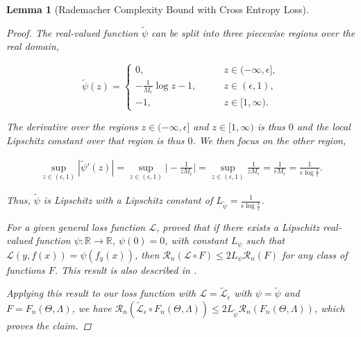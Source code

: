 \documentclass{article}
\newtheorem{lemma}[theorem]{Lemma}
\begin{document}
\begin{lemma}[Rademacher Complexity Bound with Cross Entropy Loss]
\begin{proof}
				The real-valued function $\tilde{\psi}$ can be split into three piecewise regions over the real domain,
				
				\begin{equation}
					\tilde{\psi}(z) = \begin{cases}
						0, \qquad &z \in (-\infty, \epsilon], \\
						- \frac{1}{M_{\epsilon}}\log{z} - 1, \qquad & z \in (\epsilon, 1), \\
						-1, & z \in [1, \infty).
					\end{cases}
				\end{equation}
				
				The derivative over the regions $z \in (-\infty, \epsilon]$ and $z \in [1, \infty)$ is thus $0$ and the local Lipschitz constant over that region is thus $0$. We then focus on the other region,
				
				\begin{equation}
					\begin{aligned}
						\sup_{z \in (\epsilon, 1)} | \tilde{\psi}'(z) | = \sup_{z \in (\epsilon, 1)} \bigg| - \frac{1}{z M_{\epsilon}} \bigg| = \sup_{z \in (\epsilon, 1)} \frac{1}{z M_{\epsilon}} = \frac{1}{\epsilon M_{\epsilon}} = \frac{1}{\epsilon \log{\frac{1}{\epsilon}}}.
					\end{aligned}
				\end{equation}
				
				Thus, $\tilde{\psi}$ is Lipschitz with a Lipschitz constant of $L_{\tilde{\psi}} = \frac{1}{\epsilon \log{\frac{1}{\epsilon}}}$.
				
				For a given general loss function $\mathcal{L}$, \citet[Corollary 3.17]{ledoux2013probability} proved that if there exists a Lipschitz real-valued function $\psi : \mathbb{R} \to \mathbb{R}$, $\psi(0) = 0$, with constant $L_{\psi}$ such that $\mathcal{L}(y, f(x)) = \psi(f_{y}(x))$, then $\mathcal{R}_{n}(\mathcal{L} \circ F) \leq 2 L_{\psi} \mathcal{R}_{n}(F)$ for any class of functions $F$. This result is also described in \citet[Theorem 12.4]{bartlett2002rademacher}.
				
				Applying this result to our loss function with $\mathcal{L} = \tilde{\mathcal{L}}_{\epsilon}$ with $\psi = \tilde{\psi}$ and $F = F_{n}(\Theta, \Lambda)$, we have $\mathcal{R}_{n}(\tilde{\mathcal{L}}_{\epsilon} \circ F_{n}(\Theta, \Lambda)) \leq 2 L_{\tilde{\psi}} \mathcal{R}_{n}(F_{n}(\Theta, \Lambda))$, which proves the claim.
			\end{proof}
		\end{lemma}
		
\end{document}
